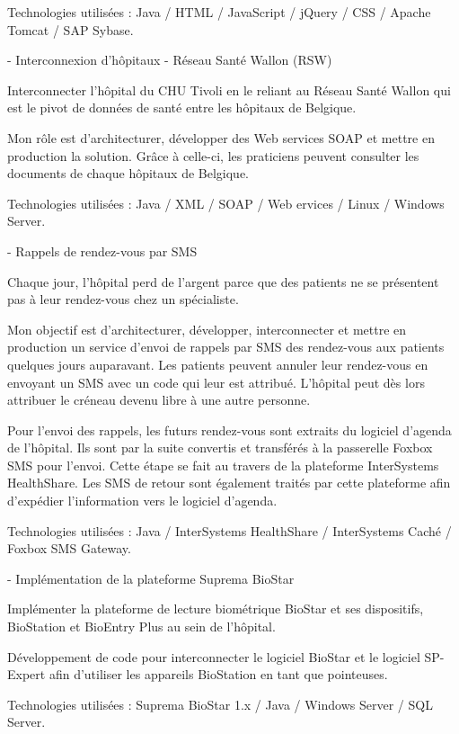 \begin{cventries}
{    Technologies utilisées : Java / HTML / JavaScript / jQuery / CSS / Apache Tomcat / SAP Sybase.

    }
    
    
   
  \cventry
    {-} %
    {Interconnexion d'hôpitaux - Réseau Santé Wallon (RSW)} %
    {} %
    {} %
    {
    Interconnecter l'hôpital du CHU Tivoli en le reliant au Réseau Santé Wallon qui est le pivot de données de santé entre les hôpitaux de Belgique.
    
    Mon rôle est d'architecturer, développer des Web services SOAP et mettre en production la solution. Grâce à celle-ci, les praticiens peuvent consulter les documents de chaque hôpitaux de Belgique.

    Technologies utilisées : Java / XML / SOAP / Web ervices / Linux / Windows Server.

    }
    
    
   
  \cventry
    {-} %
    {Rappels de rendez-vous par SMS} %
    {} %
    {} %
    {
    Chaque jour, l'hôpital perd de l'argent parce que des patients ne se présentent pas à leur rendez-vous chez un spécialiste.
    
    Mon objectif est d'architecturer, développer, interconnecter et mettre en production un service d'envoi de rappels par SMS des rendez-vous aux patients quelques jours auparavant. Les patients peuvent annuler leur rendez-vous en envoyant un SMS avec un code qui leur est attribué. L'hôpital peut dès lors attribuer le créneau devenu libre à une autre personne.
    
    Pour l'envoi des rappels, les futurs rendez-vous sont extraits du logiciel d'agenda de l'hôpital. Ils sont par la suite convertis et transférés à la passerelle Foxbox SMS pour l'envoi. Cette étape se fait au travers de la plateforme InterSystems HealthShare.
    Les SMS de retour sont également traités par cette plateforme afin d'expédier l'information vers le logiciel d'agenda.

    Technologies utilisées : Java / InterSystems HealthShare / InterSystems Caché / Foxbox SMS Gateway.

    }
    
    
 
  \cventry
    {-} %
    {Implémentation de la plateforme Suprema BioStar} %
    {} %
    {} %
    {
    Implémenter la plateforme de lecture biométrique BioStar et ses dispositifs, BioStation et BioEntry Plus au sein de l'hôpital.
    
    Développement de code pour interconnecter le logiciel BioStar et le logiciel SP-Expert afin d'utiliser les appareils BioStation en tant que pointeuses.

Technologies utilisées : Suprema BioStar 1.x / Java / Windows Server / SQL Server.
    }

\end{cventries}
